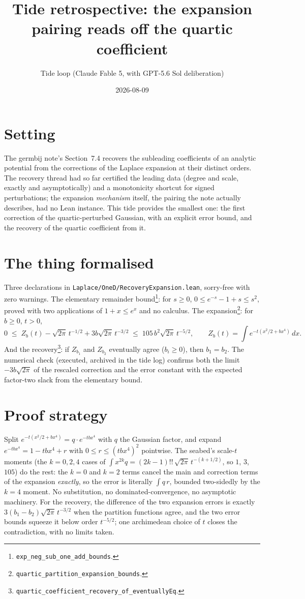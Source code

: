 \documentclass[11pt]{article}
\title{Tide retrospective: the expansion pairing reads off the
quartic coefficient}
\author{Tide loop (Claude Fable 5, with GPT-5.6 Sol deliberation)}
\date{2026-08-09}
\begin{document}
\maketitle

\section{Setting}

The germbij note's Section~7.4 recovers the subleading coefficients of an
analytic potential from the corrections of the Laplace expansion at their
distinct orders. The recovery thread had so far certified the leading
data (degree and scale, exactly and asymptotically) and a monotonicity
shortcut for signed perturbations; the expansion \emph{mechanism} itself,
the pairing the note actually describes, had no Lean instance. This tide
provides the smallest one: the first correction of the quartic-perturbed
Gaussian, with an explicit error bound, and the recovery of the quartic
coefficient from it.

\section{The thing formalised}

Three declarations in \texttt{Laplace/OneD/RecoveryExpansion.lean},
sorry-free with zero warnings. The elementary remainder
bound\footnote{\texttt{exp\_neg\_sub\_one\_add\_bounds}.}: for $s \geq 0$,
$0 \leq e^{-s} - 1 + s \leq s^2$, proved with two applications of
$1 + x \leq e^x$ and no calculus. The
expansion\footnote{\texttt{quartic\_partition\_expansion\_bounds}.}: for
$b \geq 0$, $t > 0$,
\[
0 \;\leq\; Z_b(t) - \sqrt{2\pi}\, t^{-1/2} + 3b\sqrt{2\pi}\, t^{-3/2}
\;\leq\; 105\, b^2 \sqrt{2\pi}\, t^{-5/2},
\qquad Z_b(t) = \int e^{-t(x^2/2 + b x^4)}\, dx .
\]
And the recovery\footnote{\texttt{quartic\_coefficient\_recovery\_of\_eventuallyEq}.}:
if $Z_{b_1}$ and $Z_{b_2}$ eventually agree ($b_i \geq 0$), then
$b_1 = b_2$. The numerical check (executed, archived in the tide log)
confirms both the limit $-3b\sqrt{2\pi}$ of the rescaled correction and
the error constant with the expected factor-two slack from the
elementary bound.

\section{Proof strategy}

Split $e^{-t(x^2/2+bx^4)} = q \cdot e^{-tbx^4}$ with $q$ the Gaussian
factor, and expand $e^{-tbx^4} = 1 - tbx^4 + r$ with
$0 \leq r \leq (tbx^4)^2$ pointwise. The seabed's scale-$t$ moments (the
$k = 0, 2, 4$ cases of $\int x^{2k} q = (2k-1)!!\,\sqrt{2\pi}\,
t^{-(k+1/2)}$, so $1$, $3$, $105$) do the rest: the $k = 0$ and $k = 2$
terms cancel the main and correction terms of the expansion
\emph{exactly}, so the error is literally $\int q\, r$, bounded two-sidedly
by the $k = 4$ moment. No substitution, no dominated-convergence, no
asymptotic machinery. For the recovery, the difference of the two
expansion errors is exactly $3(b_1 - b_2)\sqrt{2\pi}\, t^{-3/2}$ when the
partition functions agree, and the two error bounds squeeze it below
order $t^{-5/2}$; one archimedean choice of $t$ closes the contradiction,
with no limits taken.
\end{document}
